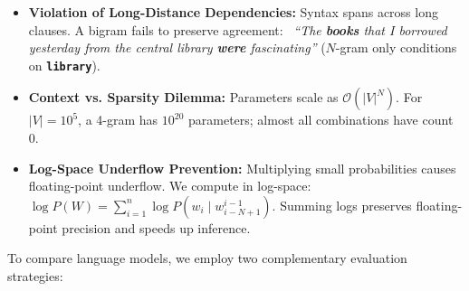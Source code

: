 \documentclass[10pt,a4paper]{article}
\newcommand{\rx}[1]{\texttt{\bfseries\color{inlinecode}#1}}
\newcommand{\xmark}{\textcolor{accentred}{\textbf{\texttimes}}}
\begin{document}
\vspace{-2pt}

\par\vspace{1pt}
\begin{itemize}[leftmargin=12pt, itemsep=0.5pt, parsep=0pt, topsep=0.5pt]
    \item \textbf{Violation of Long-Distance Dependencies:} Syntax spans across long clauses. A bigram fails to preserve agreement:
    \newline \xmark\ \textit{``The \textbf{books} that I borrowed yesterday from the central library \textbf{were} fascinating''} ($N$-gram only conditions on \rx{library}).
    \item \textbf{Context vs. Sparsity Dilemma:} Parameters scale as $\mathcal{O}(|V|^N)$. For $|V| = 10^5$, a 4-gram has $10^{20}$ parameters; almost all combinations have count 0.
    \item \textbf{Log-Space Underflow Prevention:} Multiplying small probabilities causes floating-point underflow. We compute in log-space: $\log P(W) = \sum_{i=1}^n \log P(w_i \mid w_{i-N+1}^{i-1})$. Summing logs preserves floating-point precision and speeds up inference.
\end{itemize}

\newpage


\par\vspace{1pt}
To compare language models, we employ two complementary evaluation strategies:
\end{document}

